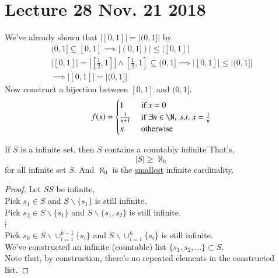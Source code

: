 \documentclass[10pt]{article}
\begin{document}
	\section{Lecture 28 Nov. 21 2018}
		\begin{example}
			We've already shown that $|[0,1]| = |(0,1]|$ by
			\begin{gather*}
				(0,1] \subseteq [0,1] \implies |(0,1])| \leq |[0,1]| \\
				|[0,1]| = |[\frac{1}{2}, 1]| \land [\frac{1}{2}, 1] \subseteq (0, 1] \implies |[0, 1]| \leq |(0, 1]| \\
				\implies |[0, 1]| = |(0,1]|
			\end{gather*}
			Now construct a bijection between $[0, 1]$ and $(0, 1]$.\\
			\begin{equation}
				f(x) = \begin{cases}
					1 &\tx{ if } x = 0 \\
					\frac{1}{n+1} &\tx{ if } \exists n \in \N,\ s.t.\ x = \frac{1}{n} \\
					x &\tx{ otherwise}
				\end{cases}
			\end{equation}
		\end{example}
		
		\begin{lemma}
			If $S$ is a infinite set, then $S$ contains a countably infinite That's,
			\[|S| \geq \aleph_0\]
			for all infinite set $S$. And $\aleph_0$ is the \ul{smallest} infinite cardinality.
		\end{lemma}
		\begin{proof}
			Let $SS$ be infinite, \\
			Pick $s_1 \in S$ and $S \backslash \{s_1\}$ is still infinite. \\
			Pick $s_2 \in S\backslash\{s_1\}$ and $S \backslash \{s_1, s_2\}$ is still infinite. \\
			$\vdots$ \\
			Pick $s_k \in S \backslash \cup_{i=1}^{k-1}\{s_i\}$ and $S \backslash \cup_{i=1}^{k}\{s_i\}$ is still infinite. \\
			We've constructed an infinite (countable) list $\{s_1, s_2, \dots\} \subset S$. \\
			Note that, by construction, there's no repeated elements in the constructed list. 
		\end{proof}
		
\end{document}
